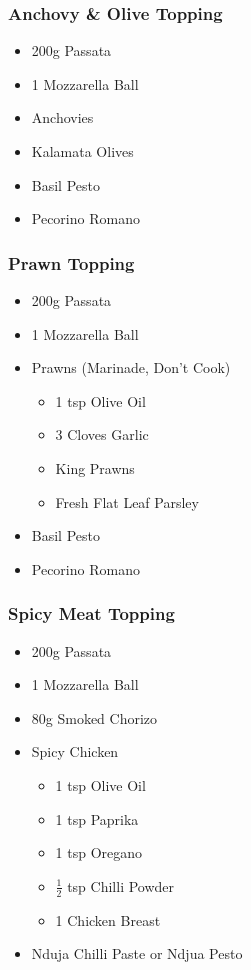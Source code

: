 \documentclass[11pt, english]{article}
\begin{document}
		\subsubsection*{Anchovy \& Olive Topping}

	\begin{itemize}
        \setlength\itemsep{0cm}
                \item 200g Passata
		\item 1 Mozzarella Ball
                \item Anchovies
		\item Kalamata Olives
		\item Basil Pesto
		\item Pecorino Romano
        \end{itemize}

		\subsubsection*{Prawn Topping}

	\begin{itemize}
        \setlength\itemsep{0cm}
                \item 200g Passata
		\item 1 Mozzarella Ball
		\item Prawns (Marinade, Don't Cook)
		\begin{itemize}
			\item 1 tsp Olive Oil
                	\item 3 Cloves Garlic
			\item King Prawns
			\item Fresh Flat Leaf Parsley
		\end{itemize}
		\item Basil Pesto
		\item Pecorino Romano
        \end{itemize}

		\subsubsection*{Spicy Meat Topping}
	
	\begin{itemize}
        \setlength\itemsep{0cm}
                \item 200g Passata
		\item 1 Mozzarella Ball
		\item 80g Smoked Chorizo
		\item Spicy Chicken 
		\begin{itemize}
			\item 1 tsp Olive Oil
			\item 1 tsp Paprika
			\item 1 tsp Oregano
			\item $\frac{1}{2}$ tsp Chilli Powder
			\item 1 Chicken Breast
		\end{itemize}
		\item Nduja Chilli Paste or Ndjua Pesto
        \end{itemize}
\end{document}
